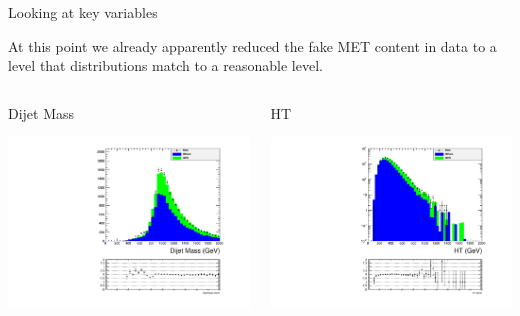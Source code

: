 \documentclass[8pt]{beamer}
\begin{document}
\begin{frame}{Looking at key variables}

At this point we already apparently reduced the fake MET content in data to a level that distributions match to a reasonable level. 

\begin{columns}
 
\begin{block}{Dijet Mass}
 
\includegraphics[width=\linewidth]{img/DEta3p6_MetSig3p0_MinDPhiJetsMet1p5/dijet_M.pdf}

\end{block}

\begin{block}{HT}

\includegraphics[width=\linewidth]{img/DEta3p6_MetSig3p0_MinDPhiJetsMet1p5/ht_LogY.pdf}
 

\end{block}
\end{columns}
\end{frame}
\end{document}
